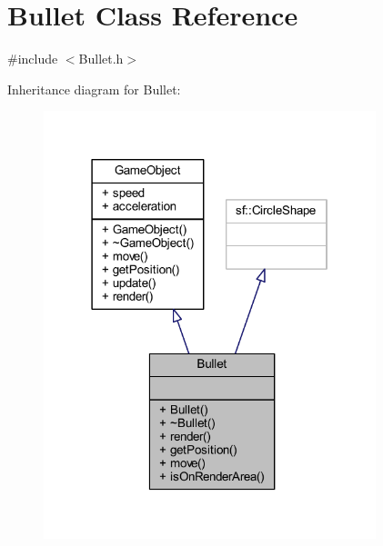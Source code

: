 \hypertarget{class_bullet}{}\section{Bullet Class Reference}
\label{class_bullet}


{\ttfamily \#include $<$Bullet.\+h$>$}



Inheritance diagram for Bullet\+:
\nopagebreak
\begin{figure}[H]
\begin{center}
\leavevmode
\includegraphics[width=274pt]{class_bullet__inherit__graph}
\end{center}
\end{figure}


